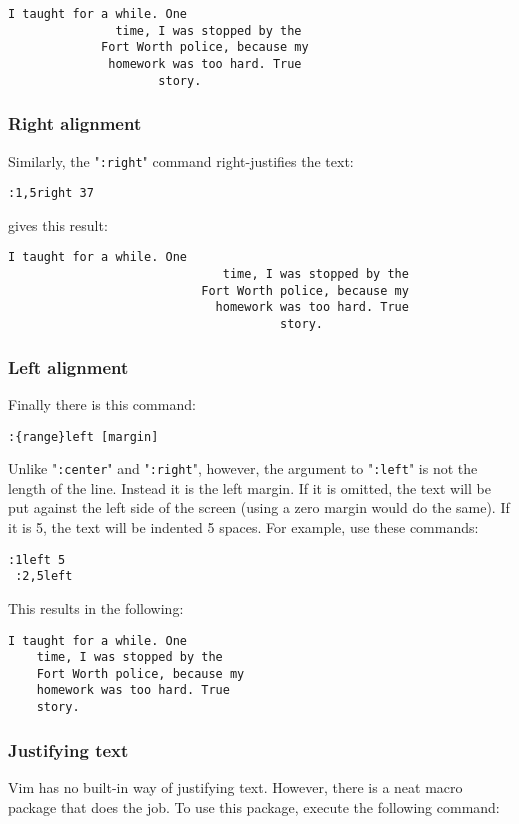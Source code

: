 \begin{Verbatim}[samepage=true]
			   I taught for a while. One 
			   time, I was stopped by the 
			 Fort Worth police, because my 
			  homework was too hard. True 
				     story. 
\end{Verbatim}
\subsubsection{Right alignment}
Similarly, the "\texttt{:right}" command right-justifies the text:

\begin{Verbatim}[samepage=true]
 :1,5right 37
\end{Verbatim}

gives this result:

\begin{Verbatim}[samepage=true]
						       I taught for a while. One 
						      time, I was stopped by the 
						   Fort Worth police, because my 
						     homework was too hard. True 
									  story. 
\end{Verbatim}
\subsubsection{Left alignment}
Finally there is this command:

\begin{Verbatim}[samepage=true]
 :{range}left [margin]
\end{Verbatim}

Unlike "\texttt{:center}" and "\texttt{:right}", however, the argument to "\texttt{:left}" is not the length of the line.
Instead it is the left margin.
If it is omitted, the text will be put against the left side of the screen (using a zero margin would do the same).
If it is 5, the text will be indented 5 spaces.
For example, use these commands:

\begin{Verbatim}[samepage=true]
 :1left 5
 :2,5left
\end{Verbatim}

This results in the following:

\begin{Verbatim}[samepage=true]
         I taught for a while. One 
    time, I was stopped by the 
    Fort Worth police, because my 
    homework was too hard. True 
    story. 
\end{Verbatim}

\subsubsection{Justifying text}
Vim has no built-in way of justifying text.
However, there is a neat macro package that does the job.
To use this package, execute the following command:

